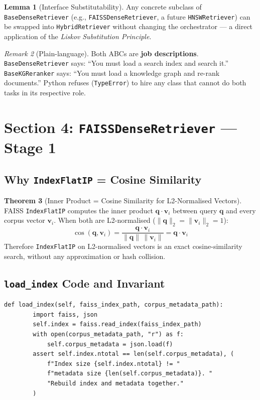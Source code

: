 \documentclass[12pt,a4paper]{article}
\theoremstyle{definition}
\newtheorem{theorem}{Theorem}[section]
\newtheorem{lemma}[theorem]{Lemma}
\theoremstyle{remark}
\newtheorem{remark}[theorem]{Remark}
\begin{document}
\begin{lemma}[Interface Substitutability]
Any concrete subclass of \texttt{BaseDenseRetriever} (e.g.,
\texttt{FAISSDenseRetriever}, a future \texttt{HNSWRetriever}) can be
swapped into \texttt{HybridRetriever} without changing the orchestrator
--- a direct application of the \emph{Liskov Substitution Principle}.
\end{lemma}

\begin{remark}[Plain-language]
Both ABCs are \textbf{job descriptions}.
\texttt{BaseDenseRetriever} says: ``You must load a search index and
search it.'' \texttt{BaseKGReranker} says: ``You must load a knowledge
graph and re-rank documents.''
Python refuses (\texttt{TypeError}) to hire any class that cannot do
both tasks in its respective role.
\end{remark}

\section{Section 4: \texttt{FAISSDenseRetriever} --- Stage 1}

\subsection{Why \texttt{IndexFlatIP} = Cosine Similarity}

\begin{theorem}[Inner Product = Cosine Similarity for L2-Normalised Vectors]
FAISS \texttt{IndexFlatIP} computes the inner product
$\mathbf{q} \cdot \mathbf{v}_i$ between query $\mathbf{q}$ and every
corpus vector $\mathbf{v}_i$.
When both are L2-normalised ($\|\mathbf{q}\|_2 = \|\mathbf{v}_i\|_2 = 1$):
\[
  \cos(\mathbf{q}, \mathbf{v}_i)
  = \frac{\mathbf{q} \cdot \mathbf{v}_i}{\|\mathbf{q}\|\,\|\mathbf{v}_i\|}
  = \mathbf{q} \cdot \mathbf{v}_i
\]
Therefore \texttt{IndexFlatIP} on L2-normalised vectors is an exact
cosine-similarity search, without any approximation or hash collision.
\end{theorem}

\subsection{\texttt{load\_index} Code and Invariant}

\begin{lstlisting}[caption={\texttt{FAISSDenseRetriever.load\_index()}}]
    def load_index(self, faiss_index_path, corpus_metadata_path):
        import faiss, json
        self.index = faiss.read_index(faiss_index_path)
        with open(corpus_metadata_path, "r") as f:
            self.corpus_metadata = json.load(f)
        assert self.index.ntotal == len(self.corpus_metadata), (
            f"Index size {self.index.ntotal} != "
            f"metadata size {len(self.corpus_metadata)}. "
            "Rebuild index and metadata together."
        )
\end{lstlisting}
\end{document}
